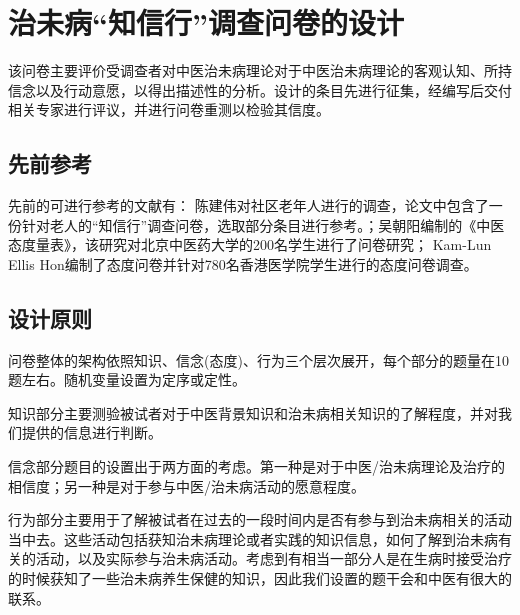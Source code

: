 \section{治未病“知信行”调查问卷的设计}
该问卷主要评价受调查者对中医治未病理论对于中医治未病理论的客观认知、所持信念以及行动意愿，以得出描述性的分析。设计的条目先进行征集，经编写后交付相关专家进行评议，并进行问卷重测以检验其信度。
\subsection{先前参考}
先前的可进行参考的文献有：
陈建伟对社区老年人进行的调查\cite{cjw_1_2009}，论文中包含了一份针对老人的“知信行”调查问卷，选取部分条目进行参考。；吴朝阳\cite{wcy2011}编制的《中医态度量表》，该研究对北京中医药大学的200名学生进行了问卷研究；
Kam-Lun Ellis Hon\cite{kam2005}编制了态度问卷并针对780名香港医学院学生进行的态度问卷调查。
\subsection{设计原则}
问卷整体的架构依照知识、信念(态度)、行为三个层次展开，每个部分的题量在10题左右。随机变量设置为定序或定性。

知识部分主要测验被试者对于中医背景知识和治未病相关知识的了解程度，并对我们提供的信息进行判断。

信念部分题目的设置出于两方面的考虑。第一种是对于中医/治未病理论及治疗的相信度；另一种是对于参与中医/治未病活动的愿意程度。

行为部分主要用于了解被试者在过去的一段时间内是否有参与到治未病相关的活动当中去。这些活动包括获知治未病理论或者实践的知识信息，如何了解到治未病有关的活动，以及实际参与治未病活动。考虑到有相当一部分人是在生病时接受治疗的时候获知了一些治未病养生保健的知识，因此我们设置的题干会和中医有很大的联系。


